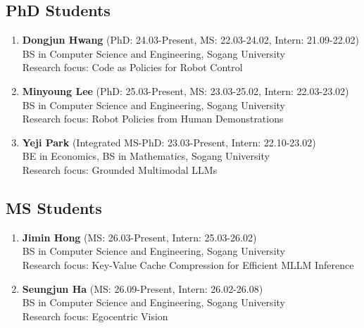 \documentclass[letterpaper,11pt]{article}
\begin{document}
\subsection*{PhD Students}
\begin{enumerate}

\item \textbf{Dongjun Hwang} (PhD: 24.03-Present, MS: 22.03-24.02, Intern: 21.09-22.02)\\
BS in Computer Science and Engineering, Sogang University\\
Research focus: Code as Policies for Robot Control

\item \textbf{Minyoung Lee} (PhD: 25.03-Present, MS: 23.03-25.02, Intern: 22.03-23.02)\\
BS in Computer Science and Engineering, Sogang University\\
Research focus: Robot Policies from Human Demonstrations

\item \textbf{Yeji Park} (Integrated MS-PhD: 23.03-Present, Intern: 22.10-23.02)\\
BE in Economics, BS in Mathematics, Sogang University\\
Research focus: Grounded Multimodal LLMs

\end{enumerate}

\subsection*{MS Students}
\begin{enumerate}

\item \textbf{Jimin Hong} (MS: 26.03-Present, Intern: 25.03-26.02)\\
BS in Computer Science and Engineering, Sogang University\\
Research focus: Key-Value Cache Compression for Efficient MLLM Inference

\item \textbf{Seungjun Ha} (MS: 26.09-Present, Intern: 26.02-26.08)\\
BS in Computer Science and Engineering, Sogang University\\
Research focus: Egocentric Vision

\end{enumerate}
\end{document}
